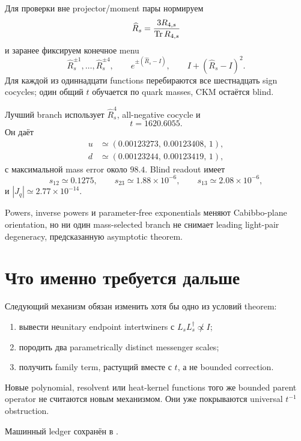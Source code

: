 Для проверки вне projector/moment пары нормируем
\begin{equation}
 \widehat R_s=\frac{3R_{4,s}}{\operatorname{Tr} R_{4,s}}
\end{equation}
и заранее фиксируем конечное menu
\begin{equation}
 \widehat R_s^{\pm1},\ldots,\widehat R_s^{\pm4},\qquad
 e^{\pm(\widehat R_s-I)},\qquad
 I+(\widehat R_s-I)^2.
\end{equation}
Для каждой из одиннадцати functions перебираются все шестнадцать sign
cocycles; один общий \(t\) обучается по quark masses, CKM остаётся blind.

Лучший branch использует \(\widehat R_s^4\), all-negative cocycle и
\begin{equation}
 t=1620.6055.
\end{equation}
Он даёт
\begin{align}
 u&\simeq(0.00123273,\,0.00123408,\,1),\\
 d&\simeq(0.00123244,\,0.00123419,\,1),
\end{align}
с максимальной mass error около \(98.4\). Blind readout имеет
\begin{equation}
 s_{12}\simeq0.1275,
 \qquad s_{23}\simeq1.88\times10^{-6},
 \qquad s_{13}\simeq2.08\times10^{-6},
\end{equation}
и \(|J_q|\simeq2.77\times10^{-14}\).

\begin{proposition}
Powers, inverse powers и parameter-free exponentials меняют Cabibbo-plane
orientation, но ни один mass-selected branch не снимает leading light-pair
degeneracy, предсказанную asymptotic theorem.
\end{proposition}

\section{Что именно требуется дальше}

Следующий механизм обязан изменить хотя бы одно из условий theorem:
\begin{enumerate}
\item вывести неunitary endpoint intertwiners с
\(L_sL_s^\dagger\not\propto I\);
\item породить два parametrically distinct messenger scales;
\item получить family term, растущий вместе с \(t\), а не bounded
correction.
\end{enumerate}

\begin{nogocriterion}
Новые polynomial, resolvent или heat-kernel functions того же bounded parent
operator не считаются новым механизмом. Они уже покрываются universal
\(t^{-1}\) obstruction.
\end{nogocriterion}

Машинный ledger сохранён в
.